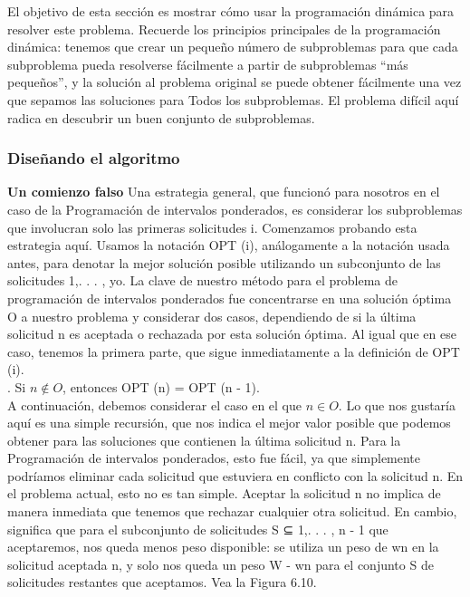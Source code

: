 \documentclass[a4paper, 12pt]{book}
\theoremstyle{dotless}
\begin{document}
El objetivo de esta sección es mostrar cómo usar la programación dinámica para resolver este problema. Recuerde los principios principales de la programación dinámica: tenemos que crear un pequeño número de subproblemas para que cada subproblema pueda resolverse fácilmente a partir de subproblemas ``más pequeños'', y la solución al problema original se puede obtener fácilmente una vez que sepamos las soluciones para Todos los subproblemas. El problema difícil aquí radica en descubrir un buen conjunto de subproblemas.\\

\subsubsection*{Diseñando el algoritmo}

\textbf{Un comienzo falso} Una estrategia general, que funcionó para nosotros en el caso de la Programación de intervalos ponderados, es considerar los subproblemas que involucran solo las primeras solicitudes i. Comenzamos probando esta estrategia aquí. Usamos la notación OPT (i), análogamente a la notación usada antes, para denotar la mejor solución posible utilizando un subconjunto de las solicitudes {1,. . . , yo}. La clave de nuestro método para el problema de programación de intervalos ponderados fue concentrarse en una solución óptima O a nuestro problema y considerar dos casos, dependiendo de si la última solicitud n es aceptada o rechazada por esta solución óptima. Al igual que en ese caso, tenemos la primera parte, que sigue inmediatamente a la definición de OPT (i).\\

. Si $n \not  \in  O$, entonces OPT (n) = OPT (n - 1).\\

A continuación, debemos considerar el caso en el que $n  \in  O$. Lo que nos gustaría aquí es una simple recursión, que nos indica el mejor valor posible que podemos obtener para las soluciones que contienen la última solicitud n. Para la Programación de intervalos ponderados, esto fue fácil, ya que simplemente podríamos eliminar cada solicitud que estuviera en conflicto con la solicitud n. En el problema actual, esto no es tan simple. Aceptar la solicitud n no implica de manera inmediata que tenemos que rechazar cualquier otra solicitud. En cambio, significa que para el subconjunto de solicitudes S ⊆ {1,. . . , n - 1} que aceptaremos, nos queda menos peso disponible: se utiliza un peso de wn en la solicitud aceptada n, y solo nos queda un peso W - wn para el conjunto S de solicitudes restantes que aceptamos. Vea la Figura 6.10.\\
\end{document}
